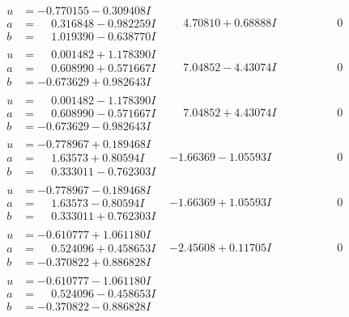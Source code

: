 \documentclass[1p]{elsarticle_modified}
\theoremstyle{definition}
\begin{document}
$$\begin{array}{c|c|c}
\begin{aligned}
u &= -0.770155 - 0.309408 I \\
a &= \phantom{-}0.316848 - 0.982259 I \\
b &= \phantom{-}1.019390 - 0.638770 I\end{aligned}
 & \phantom{-}4.70810 + 0.68888 I & \phantom{-0.000000 } 0 \\ \hline\begin{aligned}
u &= \phantom{-}0.001482 + 1.178390 I \\
a &= \phantom{-}0.608990 + 0.571667 I \\
b &= -0.673629 + 0.982643 I\end{aligned}
 & \phantom{-}7.04852 - 4.43074 I & \phantom{-0.000000 } 0 \\ \hline\begin{aligned}
u &= \phantom{-}0.001482 - 1.178390 I \\
a &= \phantom{-}0.608990 - 0.571667 I \\
b &= -0.673629 - 0.982643 I\end{aligned}
 & \phantom{-}7.04852 + 4.43074 I & \phantom{-0.000000 } 0 \\ \hline\begin{aligned}
u &= -0.778967 + 0.189468 I \\
a &= \phantom{-}1.63573 + 0.80594 I \\
b &= \phantom{-}0.333011 - 0.762303 I\end{aligned}
 & -1.66369 - 1.05593 I & \phantom{-0.000000 } 0 \\ \hline\begin{aligned}
u &= -0.778967 - 0.189468 I \\
a &= \phantom{-}1.63573 - 0.80594 I \\
b &= \phantom{-}0.333011 + 0.762303 I\end{aligned}
 & -1.66369 + 1.05593 I & \phantom{-0.000000 } 0 \\ \hline\begin{aligned}
u &= -0.610777 + 1.061180 I \\
a &= \phantom{-}0.524096 + 0.458653 I \\
b &= -0.370822 + 0.886828 I\end{aligned}
 & -2.45608 + 0.11705 I & \phantom{-0.000000 } 0 \\ \hline\begin{aligned}
u &= -0.610777 - 1.061180 I \\
a &= \phantom{-}0.524096 - 0.458653 I \\
b &= -0.370822 - 0.886828 I\end{aligned}

\end{array}$$
\end{document}
